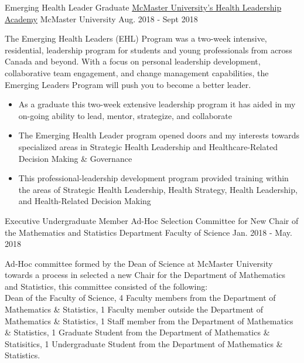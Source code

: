 \begin{cventries}
  \cventry
    {Emerging Health Leader Graduate} %
    {\href{https://www.linkedin.com/feed/update/urn:li:activity:6443522898333442048/}{McMaster University's Health Leadership Academy}} %
    {McMaster University} %
    {Aug. 2018 - Sept 2018} %
     {\renewcommand{\labelitemii}{\bullet}
      \begin{cvitems}%
        \item[] {The Emerging Health Leaders (EHL) Program was a two-week intensive, residential, leadership program for students and young professionals from across Canada and beyond. With a focus on personal leadership development, collaborative team engagement, and change management capabilities, the Emerging Leaders Program will push you to become a better leader.}
        \begin{itemize} 
            \item {As a graduate this two-week extensive leadership program it has aided in my  on-going ability to lead, mentor, strategize, and collaborate}
            \item{The Emerging Health Leader program opened doors and my interests towards specialized areas in Strategic Health Leadership and Healthcare-Related Decision Making \& Governance}
            \item{This professional-leadership development program provided training within the areas of Strategic Health Leadership, Health Strategy, Health Leadership, and Health-Related Decision Making}
        \end{itemize}
      \end{cvitems}
    }
  \cventry
    {Executive Undergraduate Member} %
    {Ad-Hoc Selection Committee for New Chair of the Mathematics and Statistics Department} %
    {Faculty of Science} %
    {Jan. 2018 - May. 2018} %
     {\renewcommand{\labelitemii}{\bullet}
      \begin{cvitems}%
        \item[] {Ad-Hoc committee formed by the Dean of Science at McMaster University towards a process in selected a new Chair for the Department of Mathematics and Statistics, this committee consisted of the following: \\Dean of the Faculty of Science, 4 Faculty members from the Department of Mathematics \& Statistics, 1 Faculty member outside the Department of Mathematics \& Statistics, 1 Staff member from the Department of Mathematics \& Statistics, 1 Graduate Student from the Department of Mathematics \& Statisitics, 1 Undergraduate Student from the Department of Mathematics \& Statistics. }

\end{cvitems}}
\end{cventries}
